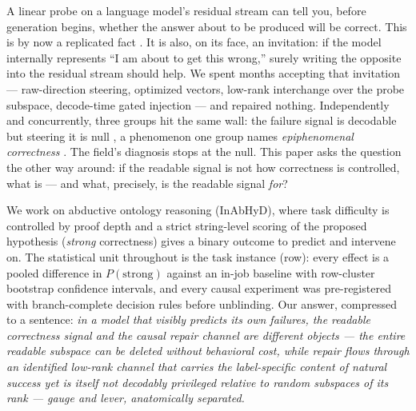 \documentclass{article} %
\begin{document}
A linear probe on a language model's residual stream can tell you,
before generation begins, whether the answer about to be produced will
be correct. This is by now a replicated fact
\citep{decodable2026, detection2026, midreasoning2026}. It is also, on
its face, an invitation: if the model internally represents ``I am
about to get this wrong,'' surely writing the opposite into the
residual stream should help. We spent months accepting that invitation
--- raw-direction steering, optimized vectors, low-rank interchange
over the probe subspace, decode-time gated injection --- and repaired
nothing. Independently and concurrently, three groups hit the same
wall: the failure signal is decodable but steering it is null
\citep{decodable2026, detection2026}, a phenomenon one group names
\emph{epiphenomenal correctness} \citep{epiphenomenal2026}. The field's
diagnosis stops at the null. This paper asks the question the other way
around: if the readable signal is not how correctness is controlled,
what is --- and what, precisely, is the readable signal \emph{for}?

We work on abductive ontology reasoning (InAbHyD), where task
difficulty is controlled by proof depth and a strict string-level
scoring of the proposed hypothesis (\emph{strong} correctness) gives a
binary outcome to predict and intervene on. The statistical unit
throughout is the task instance (row): every effect is a pooled
difference in $P(\text{strong})$ against an in-job baseline with
row-cluster bootstrap confidence intervals, and every causal experiment
was pre-registered with branch-complete decision rules before
unblinding. Our answer, compressed to a sentence: \emph{in a model that
visibly predicts its own failures, the readable correctness signal and
the causal repair channel are different objects --- the entire readable
subspace can be deleted without behavioral cost, while repair flows
through an identified low-rank channel that carries the label-specific
content of natural success yet is itself not decodably privileged
relative to random subspaces of its rank
--- gauge and lever, anatomically separated.}
\end{document}
